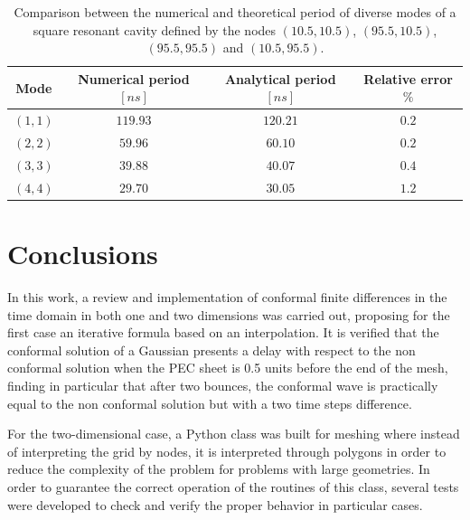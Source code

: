 \documentclass[12pt, oneside]{book}
\begin{document}
\begin{table}[]
    \centering
    \begin{tabular}{|c|c|c|c|}
    \hline
    \textbf{Mode} & \textbf{Numerical period $[ns]$} & \textbf{Analytical period $[ns]$} & \textbf{Relative error $\%$} \\ \hline
    $(1, 1)$      & $119.93$                       & $120.21$                        & $0.2$                        \\ \hline
    $(2, 2)$      & $59.96$                        & $60.10$                         & $0.2$                        \\ \hline
    $(3, 3)$      & $39.88$                        & $40.07$                         & $0.4$                        \\ \hline
    $(4, 4)$      & $29.70$                        & $30.05$                         & $1.2$                        \\ \hline
    \end{tabular}
    \caption{Comparison between the numerical and theoretical period of diverse modes of a square resonant cavity defined by the nodes $(10.5,10.5)$, $(95.5,10.5)$, $(95.5, 95.5)$ and $(10.5, 95.5)$.}
    \label{tab:PeriodComparison}
    \end{table}

\chapter{Conclusions}

In this work, a review and implementation of conformal finite differences in the time domain in both one and two dimensions was carried out, proposing for the first case an iterative formula based on an interpolation. It is verified that the conformal solution of a Gaussian presents a delay with respect to the non conformal solution when the PEC sheet is 0.5 units before the end of the mesh, finding in particular that after two bounces, the conformal wave is practically equal to the non conformal solution but with a two time steps difference.

For the two-dimensional case, a Python class was built for meshing where instead of interpreting the grid by nodes, it is interpreted through polygons in order to reduce the complexity of the problem for problems with large geometries. In order to guarantee the correct operation of the routines of this class, several tests were developed to check and verify the proper behavior in particular cases.
\end{document}
